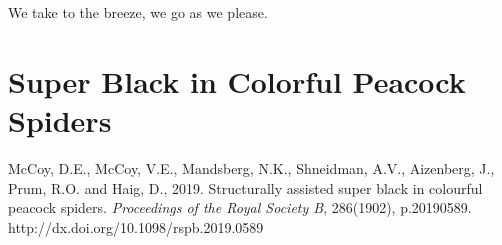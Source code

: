 \begin{savequote}[75mm]
We take to the breeze, we go as we please.
\end{savequote}

\chapter{Super Black in Colorful Peacock Spiders}

\newthought{\textcolor{SchoolColor}{Reprinted from:}}
McCoy, D.E., McCoy, V.E., Mandsberg, N.K., Shneidman, A.V., Aizenberg, J., Prum, R.O. and Haig, D., 2019. Structurally assisted super black in colourful peacock spiders. \emph{Proceedings of the Royal Society B}, 286(1902), p.20190589.
\\
\newthought{\textcolor{SchoolColor}{Article and supplement available at:}} http://dx.doi.org/10.1098/rspb.2019.0589
